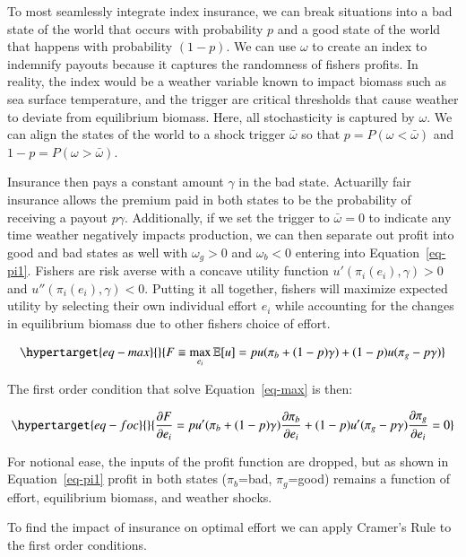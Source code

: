 \documentclass[
  super,
  preprint,
  3p]{elsarticle}
\theoremstyle{plain}
\theoremstyle{plain}
\theoremstyle{remark}
\begin{document}
To most seamlessly integrate index insurance, we can break situations
into a bad state of the world that occurs with probability \(p\) and a
good state of the world that happens with probability \((1-p)\). We can
use \(\omega\) to create an index to indemnify payouts because it
captures the randomness of fishers profits. In reality, the index would
be a weather variable known to impact biomass such as sea surface
temperature, and the trigger are critical thresholds that cause weather
to deviate from equilibrium biomass. Here, all stochasticity is captured
by \(\omega\). We can align the states of the world to a shock trigger
\(\bar\omega\) so that \(p=P(\omega<\bar\omega)\) and
\(1-p=P(\omega>\bar\omega)\).

Insurance then pays a constant amount \(\gamma\) in the bad state.
Actuarilly fair insurance allows the premium paid in both states to be
the probability of receiving a payout \(p\gamma\). Additionally, if we
set the trigger to \(\bar\omega=0\) to indicate any time weather
negatively impacts production, we can then separate out profit into good
and bad states as well with \(\omega_g>0\) and \(\omega_b<0\) entering
into Equation~\ref{eq-pi1}. Fishers are risk averse with a concave
utility function \(u'(\pi_i(e_i),\gamma)>0\) and
\(u''(\pi_i(e_i),\gamma)<0\). Putting it all together, fishers will
maximize expected utility by selecting their own individual effort
\(e_i\) while accounting for the changes in equilibrium biomass due to
other fishers choice of effort.

\begin{equation}\protect\hypertarget{eq-max}{}{
F\equiv\max_{e_i}\mathbb{E}[u]=pu(\pi_b+(1-p)\gamma)+(1-p)u(\pi_g-p\gamma)
}\label{eq-max}\end{equation}

The first order condition that solve Equation~\ref{eq-max} is then:

\begin{equation}\protect\hypertarget{eq-foc}{}{
\frac{\partial F}{\partial e_i}=pu'(\pi_b+(1-p)\gamma)\frac{\partial \pi_b}{\partial e_i}+(1-p)u'(\pi_g-p\gamma)\frac{\partial \pi_g}{\partial e_i}=0
}\label{eq-foc}\end{equation}

For notional ease, the inputs of the profit function are dropped, but as
shown in Equation~\ref{eq-pi1} profit in both states (\(\pi_b\)=bad,
\(\pi_g\)=good) remains a function of effort, equilibrium biomass, and
weather shocks.

To find the impact of insurance on optimal effort we can apply Cramer's
Rule to the first order conditions.
\end{document}
